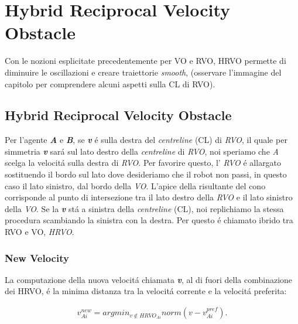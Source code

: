 
\chapter{Hybrid Reciprocal Velocity Obstacle}
\label{cap:hrvo}

Con le nozioni esplicitate precedentemente per VO e RVO, HRVO permette di diminuire le oscillazioni e creare traiettorie \textit{smooth}, (osservare l'immagine del capitolo per comprendere alcuni aspetti sulla CL di RVO).

\section{Hybrid Reciprocal Velocity Obstacle}

Per l'agente {\bfseries\textit{A}} e {\bfseries\textit{B}}, se {\bfseries\textit{v}}  \'e sulla destra del \textit{centreline} (CL) di \textit{RVO}, il quale per simmetria {\bfseries\textit{v}} sar\'a sul lato destro della \textit{centreline} di \textit{RVO}, noi speriamo che \textit{A} scelga la velocit\'a sulla destra di \textit{RVO}. Per favorire questo, l' \textit{RVO} \'e allargato sostituendo il bordo sul lato dove desideriamo che il robot non passi, in questo caso il lato sinistro, dal bordo della \textit{VO}. L'apice della risultante del cono corrisponde al punto di intersezione tra il lato destro della \textit{RVO} e il lato sinistro della \textit{VO}. Se la {\bfseries\textit{v}} st\'a a sinistra della \textit{centreline} (CL), noi replichiamo la stessa procedura scambiando la sinistra con la destra. Per questo \'e chiamato ibrido tra RVO e VO, \textit{HRVO}.  

\subsection{New Velocity}
La computazione della nuova velocit\'a chiamata {\bfseries\textit{v}}, al di fuori della combinazione dei HRVO, \'e la minima distanza tra la velocit\'a corrente e la velocit\'a preferita:

\begin{gather}
v^{new}_{Ai}= argmin_ {v \notin HRVO_{Ai}} norm(v - v^{pref}_{Ai}).
\end{gather}

